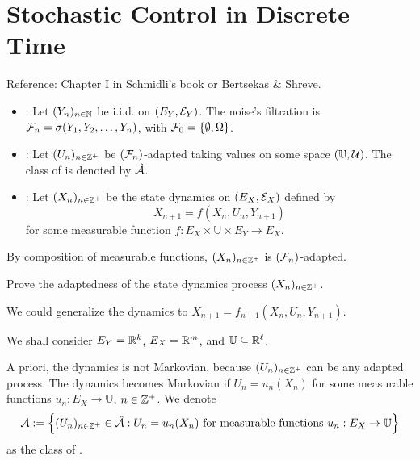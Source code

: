 \section{Stochastic Control in Discrete Time}

\begin{remark*}
    Reference: Chapter I in Schmidli's book or Bertsekas \& Shreve.
\end{remark*}

\begin{itemize}
    \item {}: Let $(Y_n)_{n \in \mathbb N}$ be i.i.d. on $(E_Y, \mathcal{E}_Y)$. 
    The noise's filtration is $\mathcal{F}_n = \sigma(Y_1, Y_2, \dots, Y_n)$, with $\mathcal{F}_0 = \{\emptyset, \Omega\}$.

    \item {}: Let $(U_n)_{n \in \mathbb Z^+}$ be $(\mathcal{F}_n)$-adapted taking values on some space $(\mathbb{U}, \mathcal{U})$. 
    The class of  is denoted by $\hat{\mathcal{A}}$.

    \item {}: Let $(X_n)_{n \in \mathbb Z^+}$ be the state dynamics on $(E_X, \mathcal{E}_X)$ defined by
    \begin{equation*}
        \boxed{X_{n+1} = f(X_n, U_n, Y_{n+1})}
    \end{equation*}
    for some measurable function $f: E_X \times \mathbb{U} \times E_Y \to E_X$.
\end{itemize}

\begin{remark}
    By composition of measurable functions, $(X_n)_{n \in \mathbb Z^+}$ is $(\mathcal{F}_n)$-adapted.
\end{remark}

\begin{homework}
    Prove the adaptedness of the state dynamics process $(X_n)_{n \in \mathbb Z^+}$.
\end{homework}

\begin{remark}
    We could generalize the dynamics to $X_{n+1} = f_{n+1}(X_n, U_n, Y_{n+1})$.
\end{remark}

\begin{remark}
    We shall consider $E_Y = \mathbb R^k$, $E_X = \mathbb R^m$, and $\mathbb{U} \subseteq \mathbb R^\ell$.
\end{remark}

\begin{remark}
    A priori, the dynamics is not Markovian, because $(U_n)_{n \in \mathbb Z^+}$ can be any adapted process. The dynamics becomes Markovian if $U_n = u_n(X_n)$ for some measurable functions $u_n: E_X \to \mathbb{U}$, $n \in \mathbb Z^+$. We denote
    \[ \mathcal{A} := \left\{ (U_n)_{n \in \mathbb Z^+} \in \hat{\mathcal{A}} : U_n = u_n(X_n) \text{ for measurable functions } u_n: E_X \to \mathbb{U} \right\} \]
    as the class of .
\end{remark}

